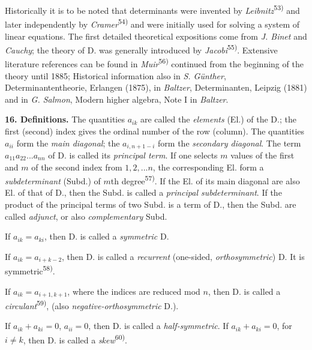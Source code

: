 \thispagestyle{fancy}

\vspace{0.5cm}

Historically it is to be noted that determinants were invented by \textit{Leibnitz}\textsuperscript{53)} and later independently by \textit{Cramer}\textsuperscript{54)} and were initially used for solving a system of linear equations. The first detailed theoretical expositions come from \textit{J. Binet} and \textit{Cauchy}; the theory of D. was generally introduced by \textit{Jacobi}\textsuperscript{55)}. Extensive literature references can be found in \textit{Muir}\textsuperscript{56)} continued from the beginning of the theory until 1885; Historical information also in \textit{S. Günther}, Determinantentheorie, Erlangen (1875), in \textit{Baltzer}, Determinanten, Leipzig (1881) and in \textit{G. Salmon}, Modern higher algebra, Note I in \textit{Baltzer}.

\vspace{0.1cm}

\textbf{16. Definitions.} The quantities $a_{ik}$ are called the \textit{elements} (El.) of the D.; the first (second) index gives the ordinal number of the row (column). The quantities $a_{ii}$ form the \textit{main diagonal}; the $a_{i,n+1-i}$ form the \textit{secondary diagonal}. The term $a_{11}a_{22}...a_{nn}$ of D. is called its \textit{principal term}. If one selects $m$ values of the first and $m$ of the second index from $1,2,...n$, the corresponding El. form a \textit{subdeterminant} (Subd.) of $m$th degree\textsuperscript{57)}. If the El. of its main diagonal are also El. of that of D., then the Subd. is called a \textit{principal subdeterminant}. If the product of the principal terms of two Subd. is a term of D., then the Subd. are called \textit{adjunct}, or also \textit{complementary} Subd.

If $a_{ik}=a_{ki}$, then D. is called a \textit{symmetric} D.

If $a_{ik}=a_{i+k-2}$, then D. is called a \textit{recurrent} (one-sided, \textit{orthosymmetric}) D. It is symmetric\textsuperscript{58)}.

If $a_{ik}=a_{i+1,k+1}$, where the indices are reduced mod $n$, then D. is called a \textit{circulant}\textsuperscript{59)}, (also \textit{negative-orthosymmetric} D.).

If $a_{ik}+a_{ki}=0$, $a_{ii}=0$, then D. is called a \textit{half-symmetric}. If $a_{ik}+a_{ki}=0$, for $i \neq k$, then D. is called a \textit{skew}\textsuperscript{60)}.

